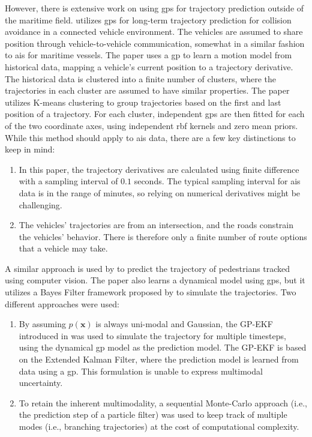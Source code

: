 However, there is extensive work on using \acrshort{gp}s for trajectory prediction outside of the maritime field. \citeauthor{vehicle_gp_prediction} \cite{vehicle_gp_prediction} utilizes \acrshort{gp}s for long-term trajectory prediction for collision avoidance in a connected vehicle environment. The vehicles are assumed to share position through vehicle-to-vehicle communication, somewhat in a similar fashion to \acrshort{ais} for maritime vessels. The paper uses a \acrshort{gp} to learn a motion model from historical data, mapping a vehicle's current position to a trajectory derivative. The historical data is clustered into a finite number of clusters, where the trajectories in each cluster are assumed to have similar properties. The paper utilizes K-means clustering \cite{murphy} to group trajectories based on the first and last position of a trajectory. For each cluster, independent \acrshort{gp}s are then fitted for each of the two coordinate axes, using independent \acrshort{rbf} kernels and zero mean priors. While this method should apply to \acrshort{ais} data, there are a few key distinctions to keep in mind:
\begin{enumerate}
    \item In this paper, the trajectory derivatives are calculated using finite difference with a sampling interval of $0.1$ seconds. The typical sampling interval for \acrshort{ais} data is in the range of minutes, so relying on numerical derivatives might be challenging.
    \item The vehicles' trajectories are from an intersection, and the roads constrain the vehicles' behavior. There is therefore only a finite number of route options that a vehicle may take.
\end{enumerate}

A similar approach is used by \citeauthor{pedestrian} \cite{pedestrian} to predict the trajectory of pedestrians tracked using computer vision. The paper also learns a dynamical model using \acrshort{gp}s, but it utilizes a Bayes Filter framework proposed by \citeauthor{gpekf} \cite{gpekf} to simulate the trajectories. Two different approaches were used:
\begin{enumerate}
    \item By assuming $p(\boldsymbol{x})$ is always uni-modal and Gaussian, the GP-EKF introduced in \cite{gpekf} was used to simulate the trajectory for multiple timesteps, using the dynamical \acrshort{gp} model as the prediction model. The GP-EKF is based on the Extended Kalman Filter, where the prediction model is learned from data using a \acrshort{gp}. This formulation is unable to express multimodal uncertainty.
    \item To retain the inherent multimodality, a sequential Monte-Carlo approach (i.e., the prediction step of a particle filter) was used to keep track of multiple modes (i.e., branching trajectories) at the cost of computational complexity.  
\end{enumerate}

